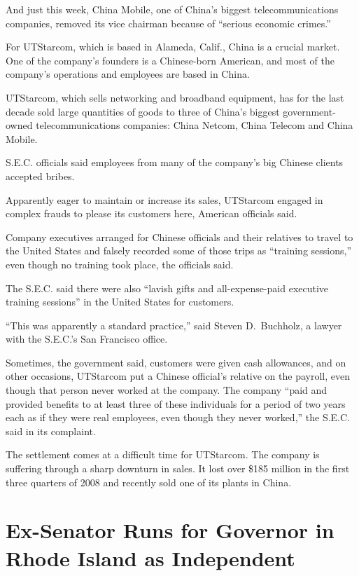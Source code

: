 ﻿\documentclass[12pt]{article}
\begin{document}
And just this week, China Mobile, one of China's biggest telecommunications companies, removed its
vice chairman because of ``serious economic crimes.''

For UTStarcom, which is based in Alameda, Calif., China is a crucial market. One of the company's
founders is a Chinese-born American, and most of the company's operations and employees are based in
China.

UTStarcom, which sells networking and broadband equipment, has for the last decade sold large
quantities of goods to three of China's biggest government-owned telecommunications companies: China
Netcom, China Telecom and China Mobile.

S.E.C. officials said employees from many of the company's big Chinese clients accepted bribes.

Apparently eager to maintain or increase its sales, UTStarcom engaged in complex frauds to please
its customers here, American officials said.

Company executives arranged for Chinese officials and their relatives to travel to the United States
and falsely recorded some of those trips as ``training sessions,'' even though no training took
place, the officials said.

The S.E.C. said there were also ``lavish gifts and all-expense-paid executive training sessions'' in
the United States for customers.

``This was apparently a standard practice,'' said Steven D.~Buchholz, a lawyer with the S.E.C.'s San
Francisco office.

Sometimes, the government said, customers were given cash allowances, and on other occasions,
UTStarcom put a Chinese official's relative on the payroll, even though that person never worked at
the company. The company ``paid and provided benefits to at least three of these individuals for a
period of two years each as if they were real employees, even though they never worked,'' the S.E.C.
said in its complaint.

The settlement comes at a difficult time for UTStarcom. The company is suffering through a sharp
downturn in sales. It lost over \$185 million in the first three quarters of 2008 and recently sold
one of its plants in China.

\section{Ex-Senator Runs for Governor in Rhode Island as Independent}
\end{document}
